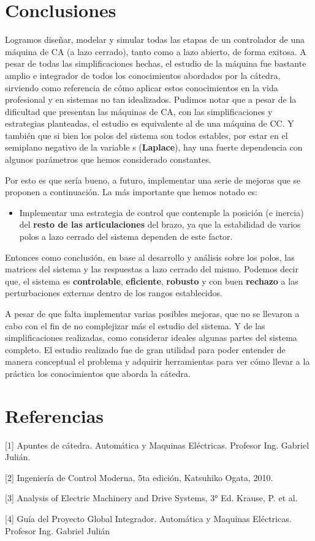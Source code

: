 \documentclass[10pt]{article}
\begin{document}
\newpage
\section{Conclusiones}
Logramos diseñar, modelar y simular todas las etapas de un controlador de una máquina de CA (a lazo cerrado), tanto como a lazo abierto, de forma exitosa.
A pesar de todas las simplificaciones hechas, el estudio de la máquina fue bastante amplio e integrador de todos los conocimientos abordados por la cátedra, sirviendo como referencia de cómo aplicar estos conocimientos en la vida profesional y en sistemas no tan idealizados.
Pudimos notar que a pesar de la dificultad que presentan las máquinas de CA, con las simplificaciones y estrategias planteadas, el estudio es equivalente al de una máquina de CC.
Y también que si bien los polos del sistema son todos estables, por estar en el semiplano negativo de la variable s (\textbf{Laplace}), hay una fuerte dependencia con algunos parámetros que hemos considerado constantes.
\\
\par
Por esto es que sería bueno, a futuro, implementar una serie de mejoras que se proponen a continuación.
La más importante que hemos notado es:
\begin{itemize}
	\item Implementar una estrategia de control que contemple la posición (e inercia) del \textbf{resto de las articulaciones} del brazo, ya que la estabilidad de varios polos a lazo cerrado del sistema dependen de este factor.
\end{itemize}

Entonces como conclusión, en base al desarrollo y análisis sobre los polos, las matrices del sistema y las respuestas a lazo cerrado del mismo.
Podemos decir que, el sistema es \textbf{controlable}, \textbf{eficiente}, \textbf{robusto} y con buen \textbf{rechazo} a las perturbaciones externas dentro de los rangos establecidos.
\\
\par
A pesar de que falta implementar varias posibles mejoras, que no se llevaron a cabo con el fin de no complejizar más el estudio del sistema.
Y de las simplificaciones realizadas, como considerar ideales algunas partes del sistema completo.
El estudio realizado fue de gran utilidad para poder entender de manera conceptual el problema y adquirir herramientas para ver cómo llevar a la práctica los conocimientos que aborda la cátedra.

\section{Referencias}

[1] Apuntes de cátedra. Automática y Maquinas Eléctricas. Profesor Ing. Gabriel Julián.

[2] Ingeniería de Control Moderna, 5ta edición, Katsuhiko Ogata, 2010.

[3] Analysis of Electric Machinery and Drive Systems, 3° Ed. Krause, P. et al.

[4] Guía del Proyecto Global Integrador. Automática y Maquinas Eléctricas. Profesor Ing. Gabriel Julián
\end{document}
